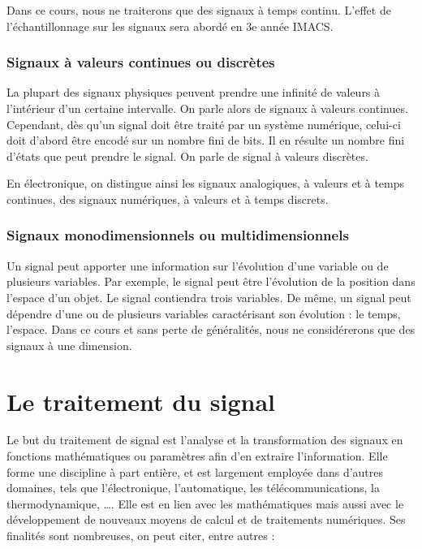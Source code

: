 	
	Dans ce cours, nous ne traiterons que des signaux à temps continu. L'effet de l'échantillonnage sur les signaux sera abordé en 3e année IMACS.

	\subsubsection{Signaux à valeurs continues ou discrètes}
	
	La plupart des signaux physiques peuvent prendre une infinité de valeurs à l'intérieur d'un certaine intervalle. On parle alors de signaux à valeurs continues. Cependant, dès qu'un signal doit être traité par un système numérique, celui-ci doit d'abord être encodé sur un nombre fini de bits. Il en résulte un nombre fini d'états que peut prendre le signal. On parle de signal à valeurs discrètes.
	
	En électronique, on distingue ainsi les signaux analogiques, à valeurs et à temps continues, des signaux numériques, à valeurs et à temps discrets.
	
	\subsubsection{Signaux monodimensionnels ou multidimensionnels}
	Un signal peut apporter une information sur l'évolution d'une variable ou de plusieurs variables. Par exemple, le signal peut être l'évolution de la position dans l'espace d'un objet. Le signal contiendra trois variables. De même, un signal peut dépendre d'une ou de plusieurs variables caractérisant son évolution : le temps, l'espace. Dans ce cours et sans perte de généralités, nous ne considérerons que des signaux à une dimension.
	

	
	
	\section{Le traitement du signal}
	
	Le but du traitement de signal est l'analyse et la transformation des signaux en fonctions mathématiques ou paramètres afin d'en extraire l'information. Elle forme une discipline à part entière, et est largement employée dans d'autres domaines, tels que l'électronique, l'automatique, les télécommunications, la thermodynamique, …. Elle est en lien avec les mathématiques mais aussi avec le développement de nouveaux moyens de calcul et de traitements numériques.
	Ses finalités sont nombreuses, on peut citer, entre autres :
	

